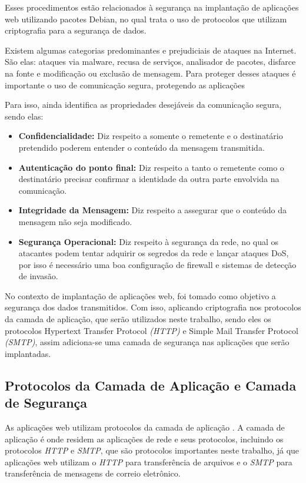 Esses procedimentos estão relacionados à segurança na implantação de aplicações web 
utilizando pacotes Debian, no qual trata o uso de protocolos que utilizam criptografia
para a segurança de dados.

Existem algumas categorias predominantes e prejudiciais de ataques na Internet. São elas: 
ataques via malware, recusa de serviços, analisador
de pacotes, disfarce na fonte e modificação ou exclusão de mensagem. Para proteger
desses ataques é importante o uso de comunicação segura, protegendo as aplicações 
\cite{kurose2010redes} 

Para isso,  ainda identifica as propriedades 
desejáveis da comunicação segura, sendo elas:

\begin{itemize}
  \item \textbf{Confidencialidade:} Diz respeito a somente o remetente e o destinatário
  pretendido poderem entender o conteúdo da mensagem transmitida.
  \item \textbf{Autenticação do ponto final:} Diz respeito a tanto o remetente como o destinatário
  precisar confirmar a identidade da outra parte envolvida na comunicação.
  \item \textbf{Integridade da Mensagem:} Diz respeito a assegurar que o conteúdo
  da mensagem não seja modificado.
  \item \textbf{Segurança Operacional:} Diz respeito à segurança da rede, no qual
  os atacantes podem tentar adquirir os segredos da rede e lançar ataques DoS,
  por isso é necessário uma boa configuração de firewall e sistemas de detecção
  de invasão.
\end{itemize}

No contexto de implantação de aplicações web, foi tomado como objetivo a segurança
dos dados transmitidos. Com isso, aplicando criptografia nos protocolos da camada
de aplicação, que serão utilizados neste trabalho, sendo eles os protocolos 
Hypertext Transfer Protocol \textit{(HTTP)} e Simple Mail Transfer Protocol 
\textit{(SMTP)}, assim adiciona-se uma camada de segurança nas aplicações que serão implantadas.

\subsection{Protocolos da Camada de Aplicação e Camada de Segurança}

As aplicações web utilizam protocolos da camada de aplicação \cite{kurose2010redes}. 
A camada de aplicação é onde residem as 
aplicações de rede e seus protocolos, incluindo os protocolos \textit{HTTP} e 
\textit{SMTP}, que são protocolos importantes neste trabalho, já que 
aplicações web utilizam o \textit{HTTP} para transferência de arquivos e o \textit{SMTP} para
transferência de mensagens de correio eletrônico. 

